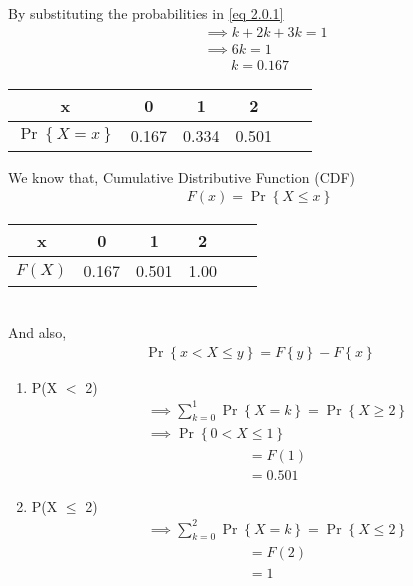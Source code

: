 \documentclass{article}
\providecommand{\cbrak}[1]{\ensuremath{\left\{#1\right\}}}
\begin{document}
\begin{enumerate}
By substituting the probabilities in \eqref{eq 2.0.1}
\begin{align}
& \implies k + 2k + 3k  = 1 \\
& \implies 6k = 1 
\end{align}
\begin{align}
    k = 0.167
\end{align}
\begin{center}
\begin{tabular}{|c|c|c|c|c|c|}
    \hline
    x &  0 & 1 & 2\\
    \hline
    $\Pr\cbrak{X=x}$ & 0.167 & 0.334 & 0.501\\
    \hline
\end{tabular} 
\end{center}
We know that, Cumulative Distributive Function (CDF) 
\begin{align}
    F(x) = \Pr\cbrak{X \le x}
\end{align}
\begin{table}[ht]
  
  \centering
  \begin{tabular}{|c|c|c|c|c|c|}
    \hline
    x &  0 & 1 & 2\\
    \hline
    $F(X)$ & 0.167 & 0.501 & 1.00 \\
    \hline
\end{tabular} 
\end{table}
\\And also, 
\begin{align}
     \Pr\cbrak{x < X \le y} = F\cbrak{y} - F\cbrak{x} 
\end{align}
 \begin{enumerate}
        \item P(X $<$ 2)
           \begin{align*}
            & \implies \sum_{k = 0}^1 \Pr\cbrak{X = k} = \Pr\cbrak{X \ge 2}\\
            & \implies \Pr\cbrak{0 < X \le 1} 
        \end{align*}
        \begin{align*}
            & = F(1)\\
            & = 0.501
        \end{align*}
        \item P(X $\leq$ 2)
        \begin{align*}
         & \implies \sum_{k = 0}^2  \Pr\cbrak{X = k} = \Pr \cbrak{X \le 2}
         \end{align*}
        \begin{align*}
            & = F(2)\\
            & = 1   
        \end{align*}
        

\end{enumerate}
\end{enumerate}
\end{document}
